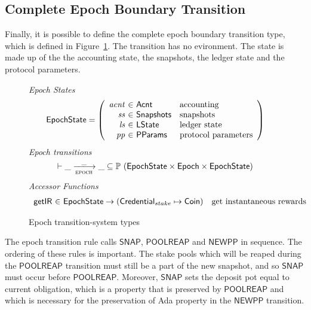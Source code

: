 \clearpage

\subsection{Complete Epoch Boundary Transition}
\label{sec:total-epoch}

Finally, it is possible to define the complete epoch boundary transition type,
which is defined in Figure~\ref{fig:ts-types:epoch}.
The transition has no evironment.
The state is made up of the the accounting state, the snapshots, the ledger state and the
protocol parameters.

\begin{figure}[htb]
  \emph{Epoch States}
  \begin{equation*}
    \EpochState =
    \left(
      \begin{array}{r@{~\in~}ll}
        \var{acnt} & \Acnt & \text{accounting}\\
        \var{ss} & \Snapshots & \text{snapshots}\\
        \var{ls} & \LState & \text{ledger state}\\
        \var{pp} & \PParams & \text{protocol parameters}\\
      \end{array}
    \right)
  \end{equation*}
  \emph{Epoch transitions}
  \begin{equation*}
    \vdash
    \var{\_} \trans{epoch}{\_} \var{\_}
    \subseteq \powerset (\EpochState \times \Epoch \times \EpochState)
  \end{equation*}
  \emph{Accessor Functions}
  \begin{equation*}
    \begin{array}{r@{~\in~}lr}
      \fun{getIR} & \EpochState \to (\StakeCredential \mapsto \Coin)
                  & \text{get instantaneous rewards} \\
    \end{array}
  \end{equation*}
  \caption{Epoch transition-system types}
  \label{fig:ts-types:epoch}
\end{figure}


The epoch transition rule calls $\mathsf{SNAP}$, $\mathsf{POOLREAP}$ and $\mathsf{NEWPP}$
in sequence.
The ordering of these rules is important.
The stake pools which will be reaped during the $\mathsf{POOLREAP}$ transition must still be a
part of the new snapshot, and so $\mathsf{SNAP}$ must occur before $\mathsf{POOLREAP}$.
Moreover, $\mathsf{SNAP}$ sets the deposit pot equal to current obligation,
which is a property that is preserved by $\mathsf{POOLREAP}$ and which
is necessary for the preservation of Ada property in the $ \mathsf{NEWPP}$ transition.

